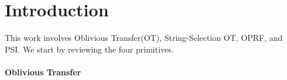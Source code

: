 
\section{Introduction}
\label{sect:intro}

This work involves Oblivious Transfer(OT), String-Selection OT, OPRF, and PSI.  We start by reviewing the four primitives.

\paragraph{Oblivious Transfer}

%
